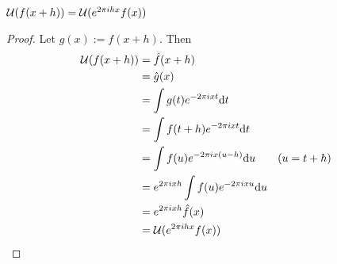 $\mathcal{U}(f(x+h)) = \mathcal{U}(e^{2\pi i h x}f(x))$
\begin{proof}
    Let $g(x) := f(x+h)$. Then
    \begin{align*}
        \mathcal{U}(f(x+h)) &= \hat{f}(x+h)\\
        &= \hat{g}(x)\\
        &= \int g(t) e^{-2\pi i xt} \dd t\\
        &= \int f(t+h) e^{-2\pi i xt} \dd t\\
        &= \int f(u) e^{-2\pi i x(u-h)} \dd u \tag{$u=t+h$}\\
        &= e^{2\pi i x h} \int f(u) e^{-2\pi i x u } \dd u \\
        &=  e^{2\pi i x h} \hat{f}(x)\\
        &= \mathcal{U}(e^{2\pi i h x}f(x))
    \end{align*}
\end{proof}